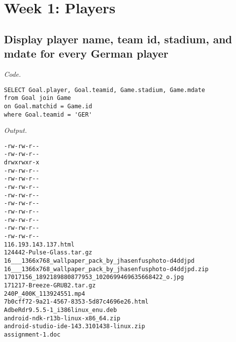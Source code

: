 \documentclass[12pt]{article}
\date{ }
\begin{document}
\tableofcontents

\newpage

\setlength{\fboxrule}{.5mm}\setlength{\fboxsep}{1.2mm}
\newlength{\boxlength}\setlength{\boxlength}{\textwidth}
\addtolength{\boxlength}{-4mm}
\begin{center}\end{center}
\vspace{5mm}

\section{Week 1: Players}

\subsection{Display player name, team id, stadium, and mdate for every German player}

\textit{Code.}

\begin{lstlisting}
SELECT Goal.player, Goal.teamid, Game.stadium, Game.mdate
from Goal join Game
on Goal.matchid = Game.id
where Goal.teamid = 'GER'
\end{lstlisting}

\textit{Output.}
\begin{lstlisting}
-rw-rw-r--
-rw-rw-r--
drwxrwxr-x
-rw-rw-r--
-rw-rw-r--
-rw-rw-r--
-rw-rw-r--
-rw-rw-r--
-rw-rw-r--
-rw-rw-r--
-rw-rw-r--
-rw-rw-r--
116.193.143.137.html
124442-Pulse-Glass.tar.gz
16___1366x768_wallpaper_pack_by_jhasenfusphoto-d4ddjpd
16___1366x768_wallpaper_pack_by_jhasenfusphoto-d4ddjpd.zip
17017156_1892189880877953_1020699469635668422_o.jpg
171217-Breeze-GRUB2.tar.gz
240P_400K_113924551.mp4
7b0cff72-9a21-4567-8353-5d87c4696e26.html
AdbeRdr9.5.5-1_i386linux_enu.deb
android-ndk-r13b-linux-x86_64.zip
android-studio-ide-143.3101438-linux.zip
assignment-1.doc
\end{lstlisting}
\end{document}
